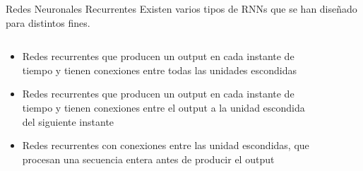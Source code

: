 \documentclass[9pt]{beamer}
\begin{document}
\begin{frame}{Redes Neuronales Recurrentes}
Existen varios tipos de RNNs que se han diseñado para distintos fines. \pause

\begin{columns}
  \begin{column}{0.5\textwidth}
    \begin{itemize}
      \item Redes recurrentes que producen un output en cada instante de tiempo y tienen conexiones entre todas las unidades escondidas \pause
      \item Redes recurrentes que producen un output en cada instante de tiempo y tienen conexiones entre el output a la unidad escondida del siguiente instante \pause
      \item Redes recurrentes con conexiones entre las unidad escondidas, que procesan una secuencia entera antes de producir el output \pause
    \end{itemize}

  \end{column}

  \begin{column}{0.5\textwidth}

    \begin{figure}[H]
    \captionsetup{font=small,labelfont=small}
    \centering
    \end{figure}

  \end{column}

\end{columns}


\end{frame}
\end{document}
